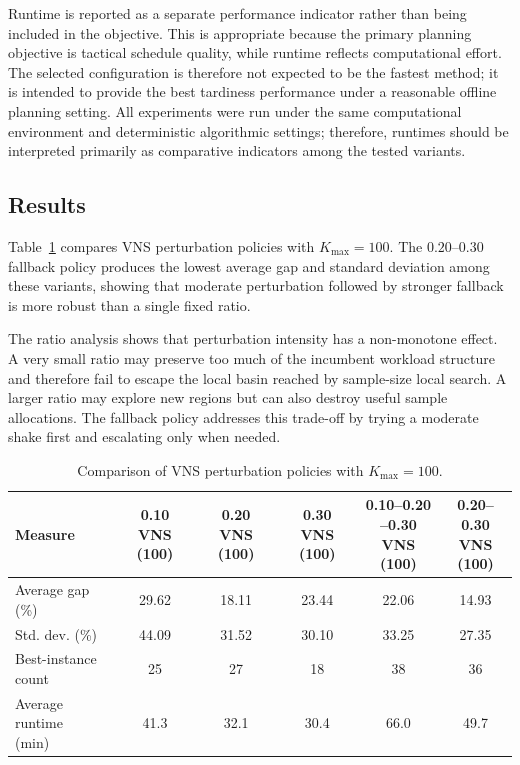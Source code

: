 \documentclass[11pt]{article}
\newcommand{\verycompacttable}{%
  \scriptsize
  \setlength{\tabcolsep}{2.2pt}%
  \renewcommand{\arraystretch}{0.80}%
}
\begin{document}
Runtime is reported as a separate performance indicator rather than being included in the objective. This is appropriate because the primary planning objective is tactical schedule quality, while runtime reflects computational effort. The selected configuration is therefore not expected to be the fastest method; it is intended to provide the best tardiness performance under a reasonable offline planning setting. All experiments were run under the same computational environment and deterministic algorithmic settings; therefore, runtimes should be interpreted primarily as comparative indicators among the tested variants.

\subsection{Results}
\label{subsec:results}

Table~\ref{tab:vns_ratio_comparison_short} compares VNS perturbation policies with \(K_{\max}=100\). The \(0.20\)--\(0.30\) fallback policy produces the lowest average gap and standard deviation among these variants, showing that moderate perturbation followed by stronger fallback is more robust than a single fixed ratio.

The ratio analysis shows that perturbation intensity has a non-monotone effect. A very small ratio may preserve too much of the incumbent workload structure and therefore fail to escape the local basin reached by sample-size local search. A larger ratio may explore new regions but can also destroy useful sample allocations. The fallback policy addresses this trade-off by trying a moderate shake first and escalating only when needed.

\begin{table}[H]
\centering
\caption{Comparison of VNS perturbation policies with \(K_{\max}=100\).}
\label{tab:vns_ratio_comparison_short}
\verycompacttable
\begin{tabular}{lccccc}
\hline
\textbf{Measure}
&
\shortstack{\textbf{0.10}\\\textbf{VNS (100)}}
&
\shortstack{\textbf{0.20}\\\textbf{VNS (100)}}
&
\shortstack{\textbf{0.30}\\\textbf{VNS (100)}}
&
\shortstack{\textbf{0.10--0.20}\\\textbf{--0.30}\\\textbf{VNS (100)}}
&
\shortstack{\textbf{0.20--0.30}\\\textbf{VNS}\\\textbf{(100)}} \\
\hline
Average gap (\%) & 29.62 & 18.11 & 23.44 & 22.06 & 14.93 \\
Std. dev. (\%) & 44.09 & 31.52 & 30.10 & 33.25 & 27.35 \\
\shortstack[l]{Best-instance\\count} & 25 & 27 & 18 & 38 & 36 \\
\shortstack[l]{Average runtime\\(min)} & 41.3 & 32.1 & 30.4 & 66.0 & 49.7 \\
\hline
\end{tabular}
\end{table}
\end{document}
